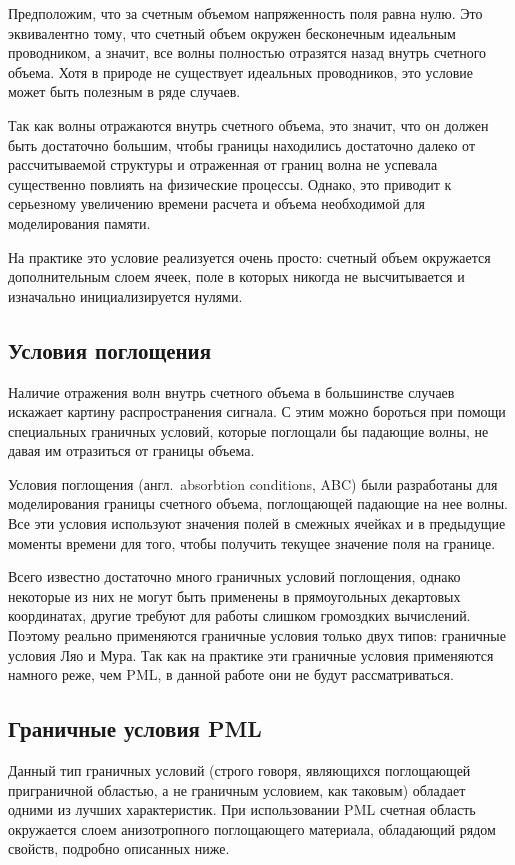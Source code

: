 Предположим, что за счетным объемом напряженность поля равна нулю. Это эквивалентно
тому, что счетный объем окружен бесконечным идеальным проводником, а значит, все
волны полностью отразятся назад внутрь счетного объема. Хотя в природе не
существует идеальных проводников, это условие может быть полезным в ряде
случаев.

Так как волны отражаются внутрь счетного объема, это значит, что он
должен быть достаточно большим, чтобы границы находились достаточно
далеко от рассчитываемой структуры и отраженная от границ волна не успевала
существенно повлиять на физические процессы. Однако, это приводит к серьезному
увеличению времени расчета и объема необходимой для моделирования памяти.

На практике это условие реализуется очень просто: счетный объем окружается
дополнительным слоем ячеек, поле в которых никогда не высчитывается и изначально
инициализируется нулями.


\subsection{Условия поглощения}

Наличие отражения волн внутрь счетного объема в большинстве случаев искажает
картину распространения сигнала. С этим можно бороться при помощи специальных
граничных условий, которые поглощали бы падающие волны, не давая им отразиться
от границы объема.

Условия поглощения (англ.~absorbtion conditions, ABC) были разработаны для
моделирования границы счетного объема, поглощающей падающие на нее волны. Все
эти условия используют значения полей в смежных ячейках и в предыдущие моменты
времени для того, чтобы получить текущее значение поля на границе.

Всего известно достаточно много граничных условий поглощения, однако некоторые
из них не могут быть применены в прямоугольных декартовых координатах, другие
требуют для работы слишком громоздких вычислений. Поэтому реально применяются
граничные условия только двух типов: граничные условия Ляо и Мура. Так как на
практике эти граничные условия применяются намного реже, чем PML, в данной
работе они не будут рассматриваться.


\subsection{Граничные условия PML}

Данный тип граничных условий (строго говоря, являющихся поглощающей приграничной
областью, а не граничным условием, как таковым) обладает одними из лучших
характеристик. При использовании PML счетная область
окружается слоем анизотропного поглощающего материала, обладающий рядом свойств,
подробно описанных ниже.

